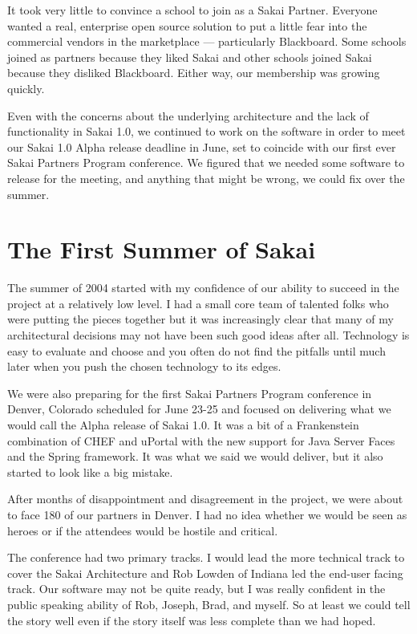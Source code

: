 \documentclass[12pt]{book}
\begin{document}
It took very little to convince a school to
join as a Sakai Partner.
Everyone wanted a real, enterprise open source
solution to put a little fear into the commercial vendors in
the marketplace --- particularly Blackboard. Some schools joined
as partners because they liked Sakai and other schools joined
Sakai because they disliked Blackboard.  Either way, our
membership was growing quickly.

Even with the concerns about the underlying architecture
and the lack of functionality in Sakai 1.0, we continued
to work on the software in order to meet our Sakai 1.0 Alpha
release deadline in June, set to coincide with our
first ever Sakai Partners Program conference.  We figured
that we needed some software to release for the meeting,
and anything that might be wrong, we could fix
over the summer.

\chapter{The First Summer of Sakai}

The summer of 2004 started with my confidence of our ability
to succeed in the project at a relatively low level.  I had
a small core team of talented folks who were putting the
pieces together but it was increasingly clear that many
of my architectural decisions may not have been such good
ideas after all.  Technology is easy to evaluate and choose
and you often do not find the pitfalls until much later when
you push the chosen technology to its edges.

We were also preparing for the first Sakai Partners Program
conference in Denver, Colorado scheduled for June 23-25 and focused
on delivering what we would call the Alpha release of Sakai 1.0.
It was a bit of a Frankenstein combination of CHEF and uPortal
with the new support for Java Server Faces and the Spring
framework.  It was what we said we would deliver, but
it also started to look like a big mistake.

After months of disappointment and disagreement in the project,
we were about to face 180 of our partners in Denver.  I had no
idea whether we would be seen as heroes or if the attendees would
be hostile and critical.

The conference had two primary tracks.  I would lead the more
technical track to cover the Sakai Architecture and Rob Lowden
of Indiana led the end-user facing track.   Our software may
not be quite ready, but I was really confident in the public speaking
ability of Rob, Joseph, Brad, and myself.  So at least we could
tell the story well even if the story itself was less complete than
we had hoped.
\end{document}
